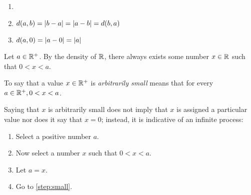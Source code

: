 \documentclass[letterpaper,12pt,fleqn]{article}
\begin{document}
\bigskip

\begin{center}
\end{center}

\begin{properties}[Distance]
  \begin{enumerate}
  \item[]
  \item \(d(a,b)=\lvert b-a\rvert=\lvert a-b\rvert=d(b,a)\)
  \item \(d(a,0)=\lvert a-0\rvert=\lvert a\rvert\)
  \end{enumerate}
\end{properties}

Let \(a\in\mathbb{R}^+\).  By the density of \(\mathbb{R}\), there always exists some number \(x\in\mathbb{R}\) such that \(0<x<a\).

\bigskip

\begin{center}
\end{center}

\begin{definition}
  To say that a value \(x\in\mathbb{R}^+\) is \emph{arbitrarily small} means that for every \(a\in\mathbb{R}^+,0<x<a\).
\end{definition}

Saying that \(x\) is arbitrarily small does not imply that \(x\) is assigned a particular value nor does it say
that \(x=0\); instead, it is indicative of an infinite process:

\begin{enumerate}
\item Select a positive number \(a\).
\item\label{step:small} Now select a number \(x\) such that \(0<x<a\).
\item Let \(a=x\).
\item Go to \ref{step:small}.
\end{enumerate}
\end{document}
